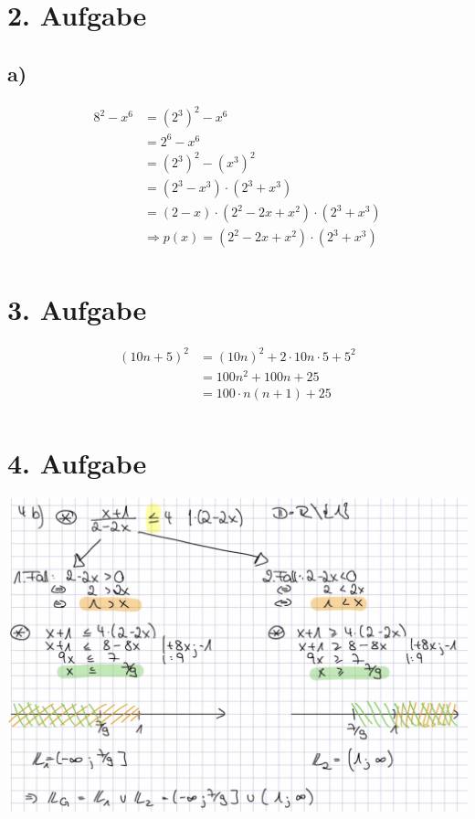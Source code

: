 \documentclass[]{article}
\newcommand{\rarr}{\Rightarrow}
\begin{document}
\section*{2. Aufgabe}
\subsection*{a)}
\begin{align*}
	&& 8^2 - x^6 &= (2^3)^2 - x^6 &&\\
	&& &= 2^6 - x^6 &&\\
	&& &= (2^3)^2 - (x^3)^2 &&\\
	&& &= (2^3 - x^3) \cdot (2^3 + x^3) &&\\
	&& &= (2-x) \cdot (2^2- 2x + x^2) \cdot (2^3 + x^3) &&\\
	&& &\rarr p(x) = (2^2- 2x + x^2) \cdot (2^3 + x^3) &&\\
\end{align*}


\section*{3. Aufgabe}
\begin{align*}
	&& (10n+5)^2 &= (10n)^2 + 2\cdot 10n \cdot 5 + 5^2 &&\\
	&& &= 100n^2 + 100n + 25 &&\\
	&& &= 100 \cdot n(n + 1) + 25 &&\\
\end{align*}

\section*{4. Aufgabe}
\begin{center}\includegraphics[scale=0.4]{4b.png}\end{center}\par
\end{document}
